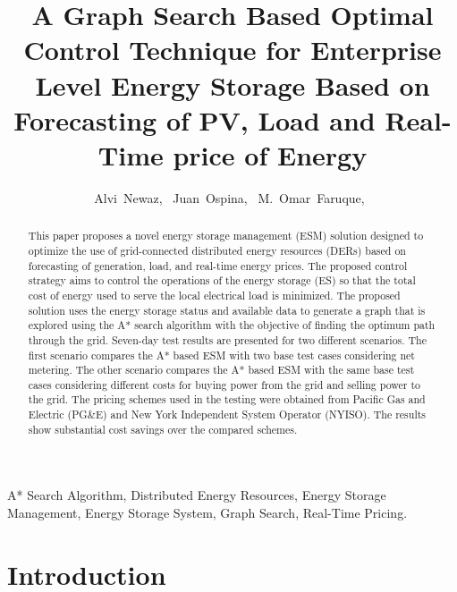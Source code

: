 \documentclass[journal]{IEEEtran}
\begin{document}
\title{A Graph Search Based Optimal Control Technique for Enterprise Level Energy Storage Based on Forecasting of PV, Load and Real-Time price of Energy}

\author{ Alvi~Newaz,~
Juan~Ospina,~
     M.~Omar~Faruque,~
        }%





\maketitle                                                               

\begin{abstract}
This paper proposes a novel energy storage management (ESM) solution designed to optimize the use of grid-connected distributed energy resources (DERs) based on forecasting of generation, load, and real-time energy prices. The proposed control strategy aims to control the operations of the energy storage (ES) so that the total cost of energy used to serve the local electrical load is minimized. The proposed solution uses the energy storage status and available data to generate a graph that is explored using the A* search algorithm with the objective of finding the optimum path through the grid. Seven-day test results are presented for two different scenarios. The first scenario compares the A* based ESM with two base test cases considering net metering. The other scenario compares the A* based ESM with the same base test cases considering different costs for buying power from the grid and selling power to the grid. The pricing schemes used in the testing were obtained from Pacific Gas and Electric (PG\&E) and New York Independent System Operator (NYISO). The results show substantial cost savings over the compared schemes. %
\end{abstract}


\begin{IEEEkeywords}
 A* Search Algorithm, Distributed Energy Resources, Energy Storage Management, Energy Storage System, Graph Search, Real-Time Pricing.
\end{IEEEkeywords}

\IEEEpeerreviewmaketitle


\section{Introduction}

\end{document}
